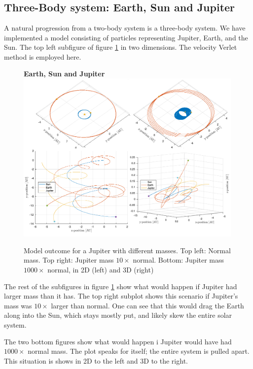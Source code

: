 \documentclass[10pt,a4paper]{amsart}
\begin{document}
\subsection{Three-Body system: Earth, Sun and Jupiter}

A natural progression from a two-body system is a three-body system. We have implemented a model consisting of particles representing Jupiter, Earth, and the Sun. The top left subfigure of figure \ref{fig:jupiter} in two dimensions. The velocity Verlet method is employed here.

\begin{figure}
	\centering
	\textbf{Earth, Sun and Jupiter}
	\includegraphics[width=0.99\textwidth]{../figures/threebody.png}
	\caption{Model outcome for a Jupiter with different masses. Top left: Normal mass. Top right: Jupiter mass $10\times$ normal. Bottom: Jupiter mass $1000\times$ normal, in 2D (left) and 3D (right)\label{fig:jupiter}}
\end{figure}

The rest of the subfigures in figure \ref{fig:jupiter} show what would happen if Jupiter had larger mass than it has. The top right subplot shows this scenario if Jupiter's mass was $10\times$ larger than normal. One can see that this would drag the Earth along into the Sun, which stays mostly put, and likely skew the entire solar system.

The two bottom figures show what would happen i Jupiter would have had $1000\times$ normal mass. The plot speaks for itself; the entire system is pulled apart. This situation is shows in 2D to the left and 3D to the right.
\end{document}
